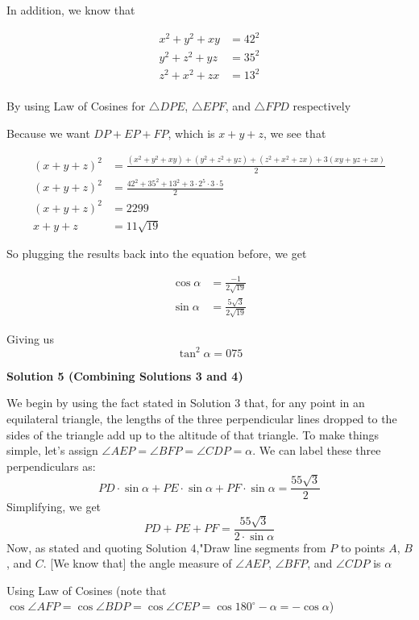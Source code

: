 \begin{enumerate}
{{ In addition, we know that

 
 \begin{align*} x^2+y^2+xy&=42^2\\ y^2+z^2+yz&=35^2\\ z^2+x^2+zx&=13^2\\ \end{align*}


 By using Law of Cosines for $\triangle{DPE}$, $\triangle{EPF}$, and $\triangle{FPD}$ respectively

 Because we want $DP+EP+FP$, which is $x+y+z$, we see that

 
 \begin{align*} (x+y+z)^2 &= \frac{(x^2+y^2+xy)+(y^2+z^2+yz)+(z^2+x^2+zx)+3(xy+yz+zx)}{2} \\ (x+y+z)^2 &= \frac{42^2+35^2+13^2+3\cdot2^5\cdot3\cdot5}{2} \\ (x+y+z)^2 &= 2299 \\ x+y+z &= 11\sqrt{19} \end{align*}


 So plugging the results back into the equation before, we get

 
 \begin{align*} \cos{\alpha} &= \frac{-1}{2\sqrt{19}}\\ \sin{\alpha} &= \frac{5\sqrt{3}}{2\sqrt{19}} \end{align*}


 Giving us 
 \[\tan^2{\alpha}=\boxed{075}\]




\textbf{Solution 5 (Combining Solutions 3 and 4)}

We begin by using the fact stated in Solution 3 that, for any point in an equilateral triangle, the lengths of the three perpendicular lines dropped to the sides of the triangle add up to the altitude of that triangle. To make things simple, let's assign $\angle AEP = \angle BFP = \angle CDP = \alpha$. We can label these three perpendiculars as:
 \[PD\cdot\sin{\alpha} + PE\cdot\sin{\alpha} + PF\cdot\sin{\alpha} = \dfrac{55 \sqrt{3}}{2}\]Simplifying, we get
 \[PD + PE + PF = \dfrac{55 \sqrt{3}}{2\cdot\sin{\alpha}}\]Now, as stated and quoting Solution 4,"Draw line segments from $P$ to points $A$, $B$, and $C$. [We know that] the angle measure of $\angle{AEP}$, $\angle{BFP}$, and $\angle{CDP}$ is $\alpha$

 Using Law of Cosines (note that $\cos{\angle{AFP}}=\cos{\angle{BDP}}=\cos{\angle{CEP}}=\cos{180^\circ-\alpha}=-\cos{\alpha}$)

}}
\end{enumerate}
